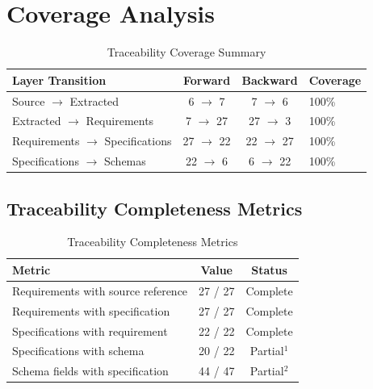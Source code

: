 \section{Coverage Analysis}
\label{sec:coverage-analysis}

\begin{table}[h]
\centering
\caption{Traceability Coverage Summary}
\label{tab:coverage-summary}
\begin{tabular}{@{}lccl@{}}
\toprule
\textbf{Layer Transition} & \textbf{Forward} & \textbf{Backward} & \textbf{Coverage} \\
\midrule
Source $\rightarrow$ Extracted & 6 $\rightarrow$ 7 & 7 $\rightarrow$ 6 & 100\% \\
Extracted $\rightarrow$ Requirements & 7 $\rightarrow$ 27 & 27 $\rightarrow$ 3 & 100\% \\
Requirements $\rightarrow$ Specifications & 27 $\rightarrow$ 22 & 22 $\rightarrow$ 27 & 100\% \\
Specifications $\rightarrow$ Schemas & 22 $\rightarrow$ 6 & 6 $\rightarrow$ 22 & 100\% \\
\bottomrule
\end{tabular}
\end{table}

\subsection{Traceability Completeness Metrics}

\begin{table}[h]
\centering
\caption{Traceability Completeness Metrics}
\label{tab:completeness-metrics}
\begin{tabular}{@{}lcc@{}}
\toprule
\textbf{Metric} & \textbf{Value} & \textbf{Status} \\
\midrule
Requirements with source reference & 27 / 27 & \textcolor{sourcegreen}{Complete} \\
Requirements with specification & 27 / 27 & \textcolor{sourcegreen}{Complete} \\
Specifications with requirement & 22 / 22 & \textcolor{sourcegreen}{Complete} \\
Specifications with schema & 20 / 22 & \textcolor{sapamber}{Partial}$^1$ \\
Schema fields with specification & 44 / 47 & \textcolor{sapamber}{Partial}$^2$ \\
\bottomrule
\end{tabular}
\end{table}

